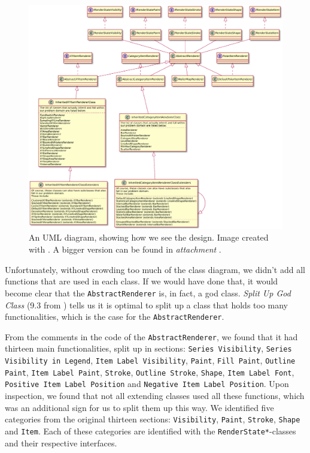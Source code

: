 \documentclass[11pt]{article}
\begin{document}
	\begin{figure}[H]
		\centering
		\includegraphics[width=\textwidth]{pictures/class-diagram-ours.pdf}
		\caption{An UML diagram, showing how we see the design. Image created with \cite{plantuml}. A bigger version can be found in \textsl{attachment \pageref{class-diagram-ours}}.}
		\label{fig:UML-ours}
	\end{figure}
	
	Unfortunately, without crowding too much of the class diagram, we didn't add all functions that are used in each class. If we would have done that, it would become clear that the \texttt{AbstractRenderer} is, in fact, a god class. \textsl{Split Up God Class} (9.3 from \cite{demeyer2009object}) tells us it is optimal to split up a class that holds too many functionalities, which is the case for the \texttt{AbstractRenderer}.
	
	From the comments in the code of the \texttt{AbstractRenderer}, we found that it had thirteen main functionalities, split up in sections: \texttt{Series Visibility}, \texttt{Series Visibility in Legend}, \texttt{Item Label Visibility}, \texttt{Paint}, \texttt{Fill Paint}, \texttt{Outline Paint}, \texttt{Item Label Paint}, \texttt{Stroke}, \texttt{Outline Stroke}, \texttt{Shape}, \texttt{Item Label Font}, \texttt{Positive Item Label Position} and \texttt{Negative Item Label Position}. Upon inspection, we found that not all extending classes used all these functions, which was an additional sign for us to split them up this way. We identified five categories from the original thirteen sections: \texttt{Visibility}, \texttt{Paint}, \texttt{Stroke}, \texttt{Shape} and \texttt{Item}. Each of these categories are identified with the \texttt{RenderState*}-classes and their respective interfaces.
	
\end{document}

